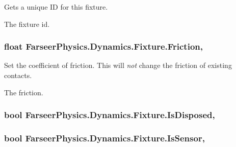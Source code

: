 Gets a unique I\+D for this fixture. 

The fixture id.\hypertarget{class_farseer_physics_1_1_dynamics_1_1_fixture_a2ac947b185b86374f7ecb2924ba3963e}{
\subsubsection[{Friction}]{\setlength{\rightskip}{0pt plus 5cm}float Farseer\+Physics.\+Dynamics.\+Fixture.\+Friction\hspace{0.3cm}{\ttfamily [get]}, {\ttfamily [set]}}}\label{class_farseer_physics_1_1_dynamics_1_1_fixture_a2ac947b185b86374f7ecb2924ba3963e}


Set the coefficient of friction. This will {\itshape not} change the friction of existing contacts. 

The friction.\hypertarget{class_farseer_physics_1_1_dynamics_1_1_fixture_a1e49dfdb61c069c2837981ce8ebf77dc}{
\subsubsection[{Is\+Disposed}]{\setlength{\rightskip}{0pt plus 5cm}bool Farseer\+Physics.\+Dynamics.\+Fixture.\+Is\+Disposed\hspace{0.3cm}{\ttfamily [get]}, {\ttfamily [set]}}}\label{class_farseer_physics_1_1_dynamics_1_1_fixture_a1e49dfdb61c069c2837981ce8ebf77dc}
\hypertarget{class_farseer_physics_1_1_dynamics_1_1_fixture_a0b2dd53a07ff30b9f550ded721c9efe0}{
\subsubsection[{Is\+Sensor}]{\setlength{\rightskip}{0pt plus 5cm}bool Farseer\+Physics.\+Dynamics.\+Fixture.\+Is\+Sensor\hspace{0.3cm}{\ttfamily [get]}, {\ttfamily [set]}}}\label{class_farseer_physics_1_1_dynamics_1_1_fixture_a0b2dd53a07ff30b9f550ded721c9efe0}


